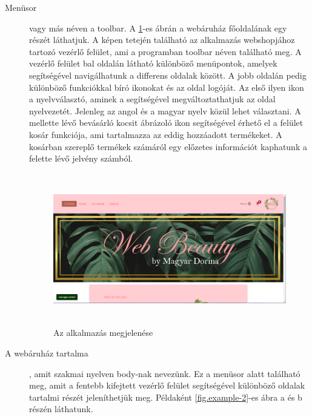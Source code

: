 \begin{description}
	\item[Menüsor] vagy más néven a toolbar. A \ref{fig.exemple-1}-es ábrán a webáruház főoldalának egy részét láthatjuk. A képen tetején található az alkalmazás webshopjához tartozó vezérlő felület, ami a programban toolbar néven található meg. A vezérlő felület bal oldalán látható különböző menüpontok, amelyek segítségével navigálhatunk a differens oldalak között. A jobb oldalán pedig különböző funkciókkal bíró ikonokat és az oldal logóját. Az első ilyen ikon a nyelvválasztó, aminek a segítségével megváltoztathatjuk az oldal nyelvezetét. Jelenleg az angol és a magyar nyelv közül lehet választani. A mellette lévő bevásárló kocsit ábrázoló ikon segítségével érhető el a felület kosár funkciója, ami tartalmazza az eddig hozzáadott termékeket. A kosárban szereplő termékek számáról egy előzetes információt kaphatunk a felette lévő jelvény számból.
	\begin{figure}[H]
		\centering
		\includegraphics[width=1.0\textwidth,height=250px]{images/webshop_home.png}
		\caption{Az alkalmazás megjelenése}
		\label{fig.exemple-1}
	\end{figure}
	\item[A webáruház tartalma], amit szakmai nyelven body-nak nevezünk. Ez a menüsor alatt található meg, amit a fentebb kifejtett vezérlő felület segítségével különböző oldalak tartalmi részét jeleníthetjük meg. Példaként \ref{fig.example-2}-es ábra a és b részén láthatunk.
	\begin{figure}[H]
		\centering

\end{figure}
\end{description}
